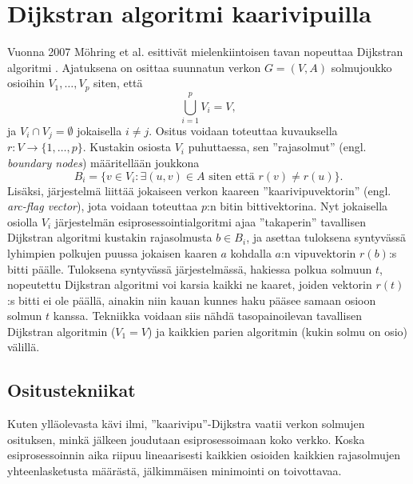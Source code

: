 \documentclass[finnish]{tktltiki2}
\theoremstyle{definition}
\theoremstyle{remark}
\begin{document}
\section{Dijkstran algoritmi kaarivipuilla}
Vuonna 2007 Möhring et al. esittivät mielenkiintoisen tavan nopeuttaa Dijkstran algoritmi \cite{Mohring07}. Ajatuksena on osittaa suunnatun verkon $G=(V, A)$ solmujoukko osioihin $V_1, \dots, V_p$ siten, että
\[
\bigcup_{i = 1}^p V_i = V,
\]
ja $V_i \cap V_j = \emptyset$ jokaisella $i \neq j$. Ositus voidaan toteuttaa kuvauksella $r \colon V \to \{1, \dots, p\}$. Kustakin osiosta $V_i$ puhuttaessa, sen ''rajasolmut'' (engl. \textit{boundary nodes}) määritellään joukkona
\[
B_i = \{ v \in V_i \colon \exists(u, v) \in A \text{ siten että } r(v) \neq r(u) \}.
\]
Lisäksi, järjestelmä liittää jokaiseen verkon kaareen ''kaarivipuvektorin'' (engl. \textit{arc-flag vector}), jota voidaan toteuttaa $p$:n bitin bittivektorina. Nyt jokaisella osiolla $V_i$ järjestelmän esiprosessointialgoritmi ajaa ''takaperin'' tavallisen Dijkstran algoritmi kustakin rajasolmusta $b \in B_i$, ja asettaa tuloksena syntyvässä lyhimpien polkujen puussa jokaisen kaaren $a$ kohdalla $a$:n vipuvektorin $r(b)$:s bitti päälle. Tuloksena syntyvässä järjestelmässä, hakiessa polkua solmuun $t$, nopeutettu Dijkstran algoritmi voi karsia kaikki ne kaaret, joiden vektorin $r(t)$:s bitti ei ole päällä, ainakin niin kauan kunnes haku pääsee samaan osioon solmun $t$ kanssa. Tekniikka voidaan siis nähdä tasopainoilevan tavallisen Dijkstran algoritmin ($V_1 = V$) ja kaikkien parien algoritmin (kukin solmu on osio) välillä.

\subsection{Ositustekniikat}
 Kuten ylläolevasta kävi ilmi, ''kaarivipu''-Dijkstra vaatii verkon solmujen osituksen, minkä jälkeen joudutaan esiprosessoimaan koko verkko. Koska esiprosessoinnin aika riipuu lineaarisesti kaikkien osioiden kaikkien rajasolmujen yhteenlasketusta määrästä, jälkimmäisen minimointi on toivottavaa. 
 
\end{document}
